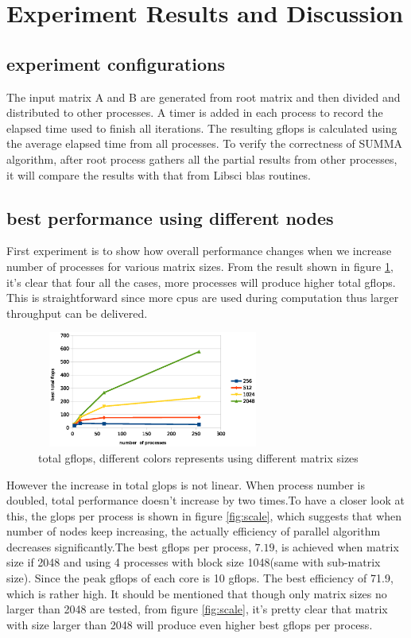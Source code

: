 \documentclass{ics-paper}
\begin{document}
\section{Experiment Results and Discussion}
\subsection{experiment configurations}
The input matrix A and B are generated from root matrix and then divided and distributed to other processes. A timer is added in each process to record the elapsed time used to finish all iterations. The resulting gflops is calculated using the average elapsed time from all processes. To verify the correctness of SUMMA algorithm, after root process gathers all the partial results from other processes, it will compare the results with that from Libsci blas routines.
\subsection{best performance using different nodes}

First experiment is to show how overall performance changes when we increase number of processes for various matrix sizes. From the result shown in figure \ref{fig:totalflops}, it's clear that four all the cases, more processes will produce higher total gflops. This is straightforward since more cpus are used during computation thus larger throughput can be delivered.
\begin{figure}
	
	\includegraphics[height=1.5in, width=3in]{total_flops}
	\caption{total gflops, different colors represents using different matrix sizes}
	\label{fig:totalflops}
\end{figure}
However the increase in total glops is not linear. When process number is doubled, total performance doesn't increase by two times.To have a closer look at this, the glops per process is shown in figure \ref{fig:scale}, which suggests that when number of nodes keep increasing, the actually efficiency of parallel algorithm decreases significantly.The best gflops per process, $7.19$, is achieved when matrix size if 2048 and using 4 processes with block size 1048(same with sub-matrix size). Since the peak gflops of each core is 10 gflops. The best efficiency of 71.9, which is rather high. It should be mentioned that though only matrix sizes no larger than 2048 are tested, from figure \ref{fig:scale}, it's pretty clear that matrix with size larger than 2048 will produce even higher best gflops per process.
\end{document}
